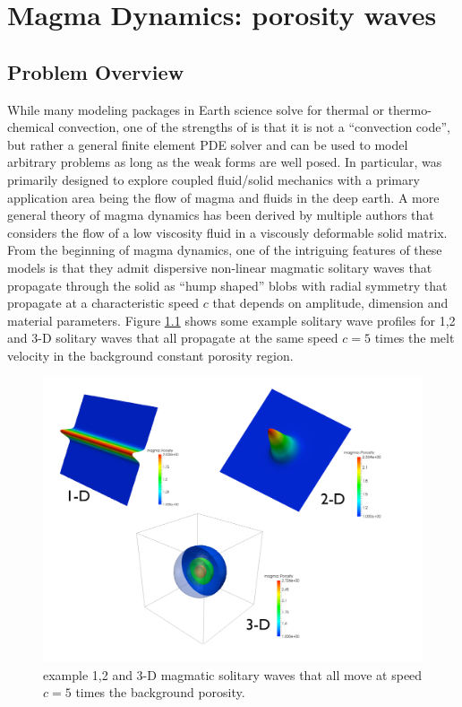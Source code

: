 \chapter{Magma Dynamics: porosity waves}
\label{cha:porosity-waves}

\section{Problem Overview}
\label{sec:porosity_waves-formulation}


While many modeling packages in Earth science solve for thermal or
thermo-chemical convection,  one of the strengths of \TF{} is that it
is not a ``convection code'', but rather a general finite element PDE
solver and can be used to model arbitrary problems as long as the weak
forms are well posed.  In particular,  \TF{} was primarily designed to
explore coupled fluid/solid mechanics with a primary application area
being the flow of magma and fluids in the deep earth.  A more general
theory of magma dynamics has been derived by multiple authors
\cite{mckenzie_generation_1984,scott_magma_1984,scott_magma_1986,spiegelman_flow_1993,spiegelman_flow_1993-1,bercovici_two-phase_2001-1,bercovici_energetics_2003,simpson_multiscale_2010,simpson_multiscale_2010-1}
that considers the flow of a low viscosity fluid in a viscously
deformable solid matrix.  From the beginning of magma dynamics,  one
of the intriguing features of these models is that they admit
dispersive non-linear magmatic
solitary  waves that propagate through the solid as ``hump
shaped'' blobs with radial symmetry that propagate at a characteristic
speed $c$ that depends on amplitude, dimension and material
parameters.  Figure \ref{fig:SolitaryWavesAllD} shows some example
solitary wave profiles for 1,2 and 3-D solitary waves that all
propagate at the same speed $c=5$ times the melt velocity in the
background constant porosity region.  

\begin{figure}[htb!]
  \centering
  \includegraphics[width=.8\textwidth]{figures/CompositeSolitaryWaves.pdf} 
  \caption{example 1,2 and 3-D magmatic solitary waves that all move
    at speed $c=5$ times the background porosity.}
  \label{fig:SolitaryWavesAllD}
\end{figure}

